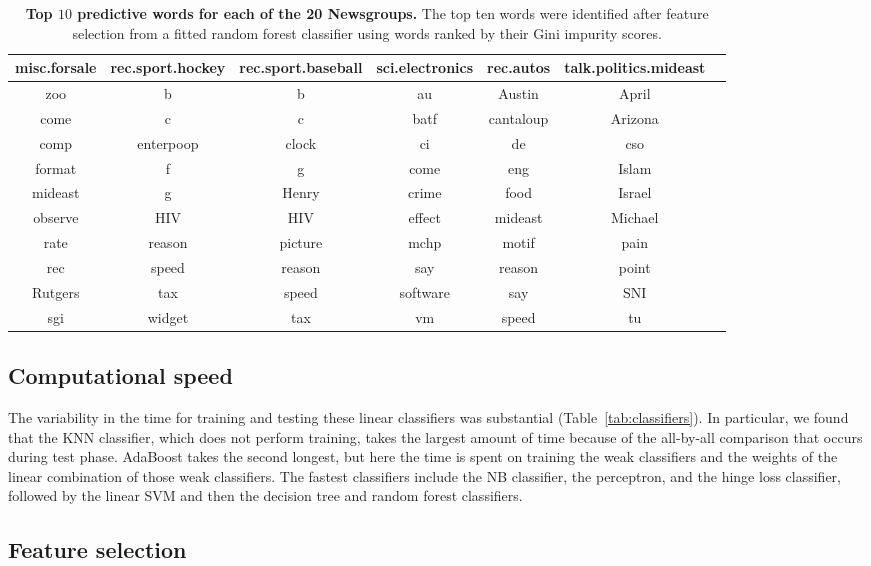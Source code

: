 \documentclass{article} %
\begin{document}
\begin{table}[htbp]
\begin{tabular}{@{}|c|c|c|c|c|c|c|@{}}
      \hline
 misc.forsale & rec.sport.hockey & rec.sport.baseball & sci.electronics & rec.autos & talk.politics.mideast & \\ \hline \hline
   zoo & b & b & au & Austin & April&\\
   come  & c & c & batf & cantaloup & Arizona&\\
   comp & enterpoop & clock & ci & de & cso&\\
   format & f & g & come & eng & Islam&\\
   mideast & g & Henry & crime & food & Israel&\\
   observe & HIV & HIV & effect & mideast & Michael&\\
   rate & reason & picture & mchp & motif & pain&\\
   rec & speed & reason & say & reason & point&\\
   Rutgers & tax & speed & software & say & SNI&\\
   sgi & widget & tax & vm & speed & tu&\\ \hline
   \end{tabular}
   \caption{{\bf Top $10$ predictive words for each of the 20 Newsgroups.} The top ten words were identified after feature selection from a fitted random forest classifier using words ranked by their Gini impurity scores.}
   \label{tab:words}
\end{table}

\subsection{Computational speed}

The variability in the time for training and testing these linear classifiers was substantial (Table~\ref{tab:classifiers}). In particular, we found that the KNN classifier, which does not perform training, takes the largest amount of time because of the all-by-all comparison that occurs during test phase. AdaBoost takes the second longest, but here the time is spent on training the weak classifiers and the weights of the linear combination of those weak classifiers. The fastest classifiers include the NB classifier, the perceptron, and the hinge loss classifier, followed by the linear SVM and then the decision tree and random forest classifiers.

\subsection{Feature selection}
\end{document}
